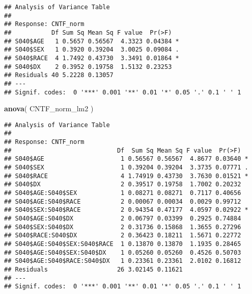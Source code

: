 \documentclass[]{article}
\newenvironment{Shaded}{\begin{snugshade}}{\end{snugshade}}
\newcommand{\KeywordTok}[1]{\textcolor[rgb]{0.13,0.29,0.53}{\textbf{#1}}}
\newcommand{\NormalTok}[1]{#1}
\begin{document}
\begin{verbatim}
## Analysis of Variance Table
## 
## Response: CNTF_norm
##           Df Sum Sq Mean Sq F value  Pr(>F)  
## S040$AGE   1 0.5657 0.56567  4.3323 0.04384 *
## S040$SEX   1 0.3920 0.39204  3.0025 0.09084 .
## S040$RACE  4 1.7492 0.43730  3.3491 0.01864 *
## S040$DX    2 0.3952 0.19758  1.5132 0.23253  
## Residuals 40 5.2228 0.13057                  
## ---
## Signif. codes:  0 '***' 0.001 '**' 0.01 '*' 0.05 '.' 0.1 ' ' 1
\end{verbatim}

\begin{Shaded}
\begin{Highlighting}[]
\KeywordTok{anova}\NormalTok{(  CNTF_norm_lm2   )}
\end{Highlighting}
\end{Shaded}

\begin{verbatim}
## Analysis of Variance Table
## 
## Response: CNTF_norm
##                             Df  Sum Sq Mean Sq F value  Pr(>F)  
## S040$AGE                     1 0.56567 0.56567  4.8677 0.03640 *
## S040$SEX                     1 0.39204 0.39204  3.3735 0.07771 .
## S040$RACE                    4 1.74919 0.43730  3.7630 0.01521 *
## S040$DX                      2 0.39517 0.19758  1.7002 0.20232  
## S040$AGE:S040$SEX            1 0.08271 0.08271  0.7117 0.40656  
## S040$AGE:S040$RACE           2 0.00067 0.00034  0.0029 0.99712  
## S040$SEX:S040$RACE           2 0.94354 0.47177  4.0597 0.02922 *
## S040$AGE:S040$DX             2 0.06797 0.03399  0.2925 0.74884  
## S040$SEX:S040$DX             2 0.31736 0.15868  1.3655 0.27296  
## S040$RACE:S040$DX            2 0.36423 0.18211  1.5671 0.22772  
## S040$AGE:S040$SEX:S040$RACE  1 0.13870 0.13870  1.1935 0.28465  
## S040$AGE:S040$SEX:S040$DX    1 0.05260 0.05260  0.4526 0.50703  
## S040$AGE:S040$RACE:S040$DX   1 0.23361 0.23361  2.0102 0.16812  
## Residuals                   26 3.02145 0.11621                  
## ---
## Signif. codes:  0 '***' 0.001 '**' 0.01 '*' 0.05 '.' 0.1 ' ' 1
\end{verbatim}
\end{document}
